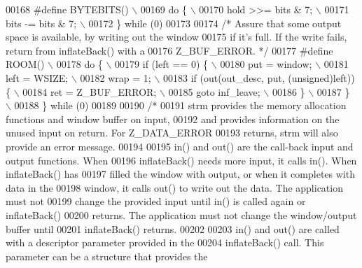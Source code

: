 \begin{DoxyCode}
{{{{00168 \textcolor{preprocessor}{#define BYTEBITS() \(\backslash\)}
00169 \textcolor{preprocessor}{    do \{ \(\backslash\)}
00170 \textcolor{preprocessor}{        hold >>= bits & 7; \(\backslash\)}
00171 \textcolor{preprocessor}{        bits -= bits & 7; \(\backslash\)}
00172 \textcolor{preprocessor}{    \} while (0)}
00173 
00174 \textcolor{comment}{/* Assure that some output space is available, by writing out the window}
00175 \textcolor{comment}{   if it's full.  If the write fails, return from inflateBack() with a}
00176 \textcolor{comment}{   Z\_BUF\_ERROR. */}
00177 \textcolor{preprocessor}{#define ROOM() \(\backslash\)}
00178 \textcolor{preprocessor}{    do \{ \(\backslash\)}
00179 \textcolor{preprocessor}{        if (left == 0) \{ \(\backslash\)}
00180 \textcolor{preprocessor}{            put = window; \(\backslash\)}
00181 \textcolor{preprocessor}{            left = WSIZE; \(\backslash\)}
00182 \textcolor{preprocessor}{            wrap = 1; \(\backslash\)}
00183 \textcolor{preprocessor}{            if (out(out\_desc, put, (unsigned)left)) \{ \(\backslash\)}
00184 \textcolor{preprocessor}{                ret = Z\_BUF\_ERROR; \(\backslash\)}
00185 \textcolor{preprocessor}{                goto inf\_leave; \(\backslash\)}
00186 \textcolor{preprocessor}{            \} \(\backslash\)}
00187 \textcolor{preprocessor}{        \} \(\backslash\)}
00188 \textcolor{preprocessor}{    \} while (0)}
00189 
00190 \textcolor{comment}{/*}
00191 \textcolor{comment}{   strm provides the memory allocation functions and window buffer on input,}
00192 \textcolor{comment}{   and provides information on the unused input on return.  For Z\_DATA\_ERROR}
00193 \textcolor{comment}{   returns, strm will also provide an error message.}
00194 \textcolor{comment}{}
00195 \textcolor{comment}{   in() and out() are the call-back input and output functions.  When}
00196 \textcolor{comment}{   inflateBack() needs more input, it calls in().  When inflateBack() has}
00197 \textcolor{comment}{   filled the window with output, or when it completes with data in the}
00198 \textcolor{comment}{   window, it calls out() to write out the data.  The application must not}
00199 \textcolor{comment}{   change the provided input until in() is called again or inflateBack()}
00200 \textcolor{comment}{   returns.  The application must not change the window/output buffer until}
00201 \textcolor{comment}{   inflateBack() returns.}
00202 \textcolor{comment}{}
00203 \textcolor{comment}{   in() and out() are called with a descriptor parameter provided in the}
00204 \textcolor{comment}{   inflateBack() call.  This parameter can be a structure that provides the}
}}}}
\end{DoxyCode}
